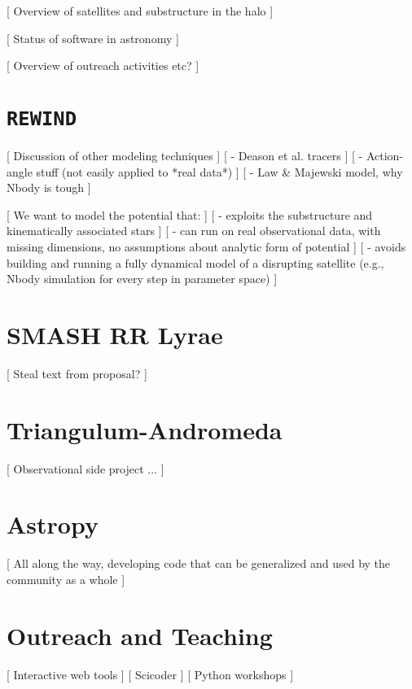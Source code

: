 \documentclass[letterpaper,12pt,preprint]{aastex}
\begin{document}
[ Overview of satellites and substructure in the halo ]

[ Status of software in astronomy ]

[ Overview of outreach activities etc? ]

\section{\texttt{REWIND}}

[ Discussion of other modeling techniques ]
[ - Deason et al. tracers ]
[ - Action-angle stuff (not easily applied to *real data*) ]
[ - Law \& Majewski model, why Nbody is tough ]

[ We want to model the potential that: ]
[ - exploits the substructure and kinematically associated stars ]
[ - can run on real observational data, with missing dimensions, no assumptions about analytic form of potential ]
[ - avoids building and running a fully dynamical model of a disrupting satellite (e.g., Nbody simulation for every step in parameter space) ]

\section{SMASH RR Lyrae}

[ Steal text from proposal? ]

\section{Triangulum-Andromeda}

[ Observational side project ... ]

\section{Astropy}

[ All along the way, developing code that can be generalized and used by the community as a whole ]

\section{Outreach and Teaching}

[ Interactive web tools ]
[ Scicoder ]
[ Python workshops ]
\end{document}
